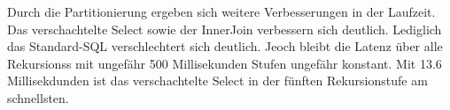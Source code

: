 Durch die Partitionierung ergeben sich weitere Verbesserungen in der Laufzeit. Das verschachtelte Select sowie der InnerJoin verbessern sich deutlich. Lediglich das Standard-SQL verschlechtert sich deutlich. Jeoch bleibt die Latenz über alle Rekursionss mit ungefähr 500 Millisekunden Stufen ungefähr konstant.  Mit 13.6 Millisekdunden ist das verschachtelte Select in der fünften Rekursionstufe am schnellsten.   


